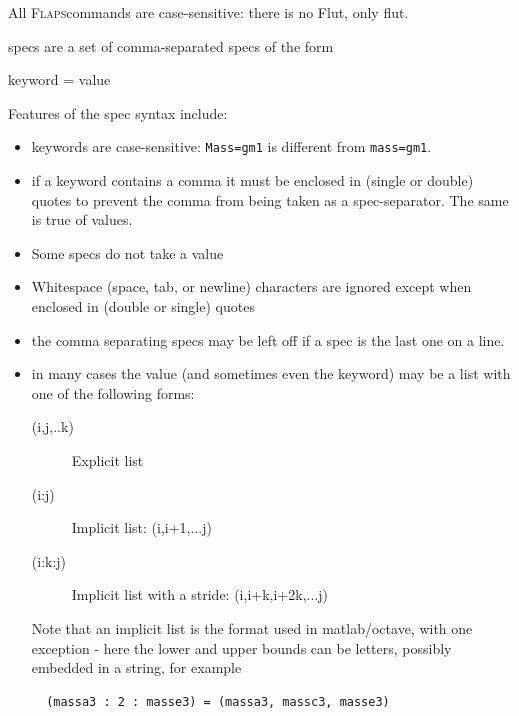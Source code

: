 \documentclass[11pt,openany,twoside]{book}
\numberwithin{equation}{section}		%
\newcommand{\Cmd}[1]{{\sf #1}}
\newcommand{\Code}[1]{{\small\tt #1}}
\newcommand{\Subst}[1]{{\small\sf #1}}
\newcommand{\Flaps}{\textsc{Flaps\:}}
\newcommand{\Octlab}{\Cmd{matlab}/\Cmd{octave}\:}
\newcommand{\Spec}[1]{{\small\ttfamily #1}}
\begin{document}
All \Flaps commands are case-sensitive: there is no \Cmd{Flut},
only \Cmd{flut}.
\par
\Subst{specs} are a set of comma-separated specs of the form
\par
\hspace{0.5in} \Spec{keyword} = \Subst{value}
\par
Features of the spec syntax include:
\begin{itemize}
\item \Spec{keyword}s are case-sensitive: \Code{Mass=gm1}
is different from \Code{mass=gm1}.
        
\item
\par
if a \Spec{keyword} contains a comma it must be enclosed
in (single or double) quotes to prevent the comma from being
taken as a spec-separator. The same is true of \Spec{value}s.
        
\item 
\par
Some specs do not take a \Spec{value}
        
\item 
\par
Whitespace (space, tab, or newline) characters are ignored except when
enclosed in (double or single) quotes
        
\item 
\par
the comma separating specs may be left off if a
spec is the last one on a line.
        
\item 
\par
in many cases the {\sffamily value} (and sometimes even the {\sffamily keyword})
may be a list with one of the following forms:
                
\begin{description}
\item[\Subst{(i,j,..k)\/}] Explicit list
\item[\Subst{(i:j)\/}] Implicit list: \Subst{(i,i+1,...j)}
\item[\Subst{(i:k:j)\/}] Implicit list with a stride: \Subst{(i,i+k,i+2k,...j)}
\end{description}\label{sect:implicit-list}
Note that an implicit list is the format used in \Octlab, with one exception -
here the lower and upper bounds can be letters, possibly embedded in a string,
for example
\begin{lstlisting}
  (massa3 : 2 : masse3) = (massa3, massc3, masse3)
\end{lstlisting}
        
\end{itemize}
\end{document}
